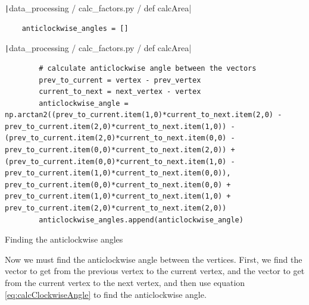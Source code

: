 \documentclass[12pt]{report}
\newcommand{\pil}[1]{\protect\texttt|#1|}
\begin{document}
\begin{center}
\end{center}

\begin{listing}[H]
\pil{data_processing / calc_factors.py / def calcArea}
\begin{verbatim}
    anticlockwise_angles = []
\end{verbatim}
\pil{data_processing / calc_factors.py / def calcArea}
\begin{verbatim}
        # calculate anticlockwise angle between the vectors
        prev_to_current = vertex - prev_vertex
        current_to_next = next_vertex - vertex
        anticlockwise_angle = np.arctan2((prev_to_current.item(1,0)*current_to_next.item(2,0) - prev_to_current.item(2,0)*current_to_next.item(1,0)) - (prev_to_current.item(2,0)*current_to_next.item(0,0) - prev_to_current.item(0,0)*current_to_next.item(2,0)) + (prev_to_current.item(0,0)*current_to_next.item(1,0) - prev_to_current.item(1,0)*current_to_next.item(0,0)), prev_to_current.item(0,0)*current_to_next.item(0,0) + prev_to_current.item(1,0)*current_to_next.item(1,0) + prev_to_current.item(2,0)*current_to_next.item(2,0))
        anticlockwise_angles.append(anticlockwise_angle)
\end{verbatim}
\caption{Finding the anticlockwise angles}\label{cs:dofxAnticlockwiseAngles}
\end{listing}

Now we must find the anticlockwise angle between the vertices. First, we find the vector to get from the previous vertex to the current vertex, and the vector to get from the current vertex to the next vertex, and then use equation \ref{eq:calcClockwiseAngle} to find the anticlockwise angle.
\end{document}
